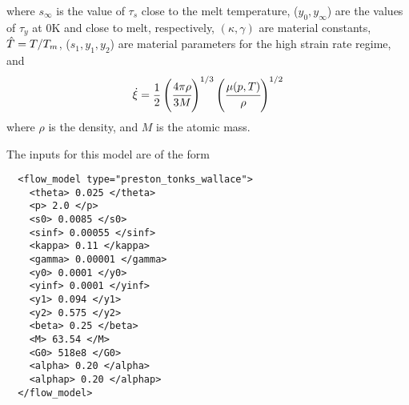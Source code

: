 where $s_{\infty}$ is the value of $\tau_s$ close to the melt temperature,
($y_0, y_{\infty}$) are the values of $\tau_y$ at 0K and close to melt,
respectively, $(\kappa, \gamma)$ are material constants, $\hat{T} = T/T_m$,
($s_1, y_1, y_2$) are material parameters for the high strain rate
regime, and
\begin{equation}
  \dot{\xi} = \frac{1}{2}\left(\cfrac{4\pi\rho}{3M}\right)^{1/3}
           \left(\cfrac{\mu(p,T)}{\rho}\right)^{1/2}
\end{equation}
where $\rho$ is the density, and $M$ is the atomic mass.

The inputs for this model are of the form
\lstset{language=XML}
\begin{lstlisting}
  <flow_model type="preston_tonks_wallace">
    <theta> 0.025 </theta>
    <p> 2.0 </p>
    <s0> 0.0085 </s0>
    <sinf> 0.00055 </sinf>
    <kappa> 0.11 </kappa>
    <gamma> 0.00001 </gamma>
    <y0> 0.0001 </y0>
    <yinf> 0.0001 </yinf>
    <y1> 0.094 </y1>
    <y2> 0.575 </y2>
    <beta> 0.25 </beta>
    <M> 63.54 </M>
    <G0> 518e8 </G0>
    <alpha> 0.20 </alpha>
    <alphap> 0.20 </alphap>
  </flow_model>
\end{lstlisting}

